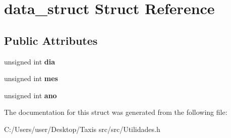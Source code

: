 \hypertarget{structdata__struct}{}\section{data\+\_\+struct Struct Reference}
\label{structdata__struct}
\subsection*{Public Attributes}
\begin{DoxyCompactItemize}
\item 
\mbox{\label{structdata__struct_a17a70fb8ce7ea58aff3b0ba60b7f5e5b}} 
unsigned int {\bfseries dia}
\item 
\mbox{\label{structdata__struct_a07c99afd664b3c1d36462e87201f2a89}} 
unsigned int {\bfseries mes}
\item 
\mbox{\label{structdata__struct_a1d3ed5c9543d622a7ed8785f8007f8f9}} 
unsigned int {\bfseries ano}
\end{DoxyCompactItemize}


The documentation for this struct was generated from the following file\+:\begin{DoxyCompactItemize}
\item 
C\+:/\+Users/user/\+Desktop/\+Taxis src/src/Utilidades.\+h\end{DoxyCompactItemize}
